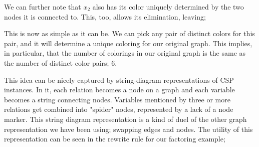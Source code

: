 We can further note that $x_2$ also has its color uniquely determined by the two nodes it is connected to. This, too, allows its elimination, leaving;

\begin{center}
\end{center}

This is now as simple as it can be. We can pick any pair of distinct colors for this pair, and it will determine a unique coloring for our original graph. This implies, in particular, that the number of colorings in our original graph is the same as the number of distinct color pairs; 6.

This idea can be nicely captured by string-diagram representations of CSP instances. In it, each relation becomes a node on a graph and each variable becomes a string connecting nodes. Variables mentioned by three or more relations get combined into "spider" nodes, represented by a lack of a node marker. This string diagram representation is a kind of duel of the other graph representation we have been using; swapping edges and nodes. The utility of this representation can be seen in the rewrite rule for our factoring example;

\begin{center}
\end{center}

